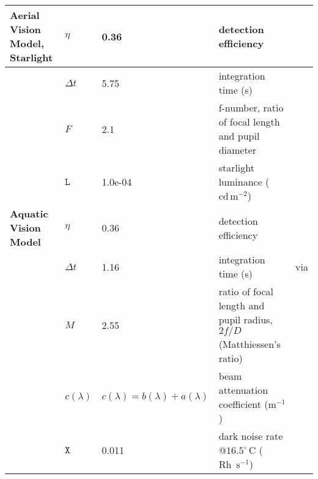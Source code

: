 \begin{tabular}{|L{3.5cm}|L{2cm}|L{2cm}|L{4.5cm}|L{4.5cm}|}
\textbf{Aerial Vision Model, Starlight}&$\eta$&0.36&detection efficiency&\cite{Nils14a}\\\hline
 &$\Delta t$&5.75&integration time (s)&\cite{Donn95a}\\\hline
 &$F$&2.1&f-number, ratio of focal length and pupil diameter&\cite{Mill79a}\\\hline
 &$\mathtt{L}$&1.0e-04&starlight luminance ($\text{cd}\, \text{m}^{-2}$)&\cite{Midd52a}\\\hline
\textbf{Aquatic Vision Model}&$\eta$&0.36&detection efficiency&\cite{Nils14a}\\\hline
 &$\Delta t$&1.16&integration time (s)&\cite{Donn95a} via \cite{Nils14a}\\\hline
 &$M$&2.55&ratio of focal length and pupil radius, $2f/D$ (Matthiessen's ratio)&\cite{Nils14a}\\\hline
 &$c(\lambda)$&$c(\lambda)=b(\lambda)+a(\lambda)$&beam attenuation coefficient ($\text{m}^{-1}$)&\cite{Midd52a}\\\hline
 &$\mathtt{X}$&0.011&dark noise rate @$16.5^{\circ} \, \text{C}$ ($\text{Rh } \,\text{s}^{-1}$)&\cite{Aho93a}\\\hline
\end{tabular}
